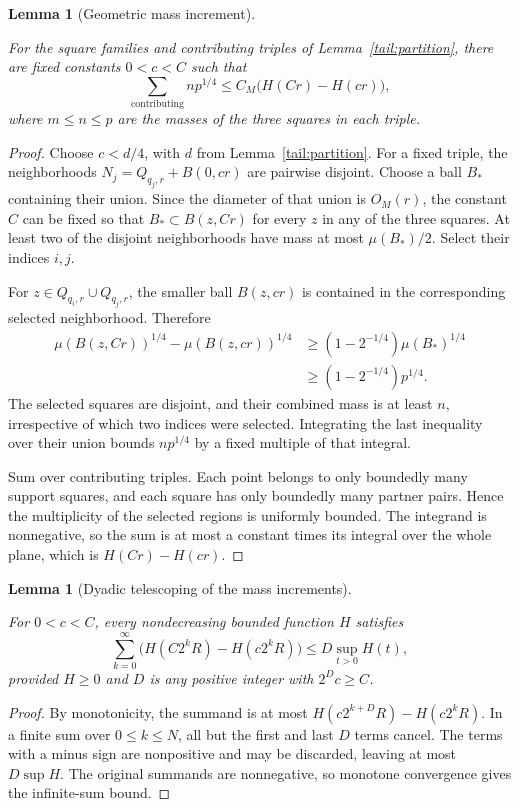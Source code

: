 \documentclass[11pt]{amsart}
\newtheorem{lemma}[theorem]{Lemma}
\theoremstyle{definition}
\theoremstyle{remark}
\numberwithin{equation}{section}
\providecommand{\lean}[1]{}
\providecommand{\leanok}{}
\begin{document}
\begin{lemma}[Geometric mass increment]\label{tail:increment}
\lean{Auto.tail_increment}
\leanok
For the square families and contributing triples of
Lemma~\ref{tail:partition}, there are fixed constants $0<c<C$ such that
\[
 \sum_{\mathrm{contributing}}n p^{1/4}
       \le C_M\big(H(Cr)-H(cr)\big),
\]
where $m\le n\le p$ are the masses of the three squares in each triple.
\end{lemma}
\begin{proof}
Choose $c<d/4$, with $d$ from Lemma~\ref{tail:partition}. For a fixed
triple, the neighborhoods $N_j=Q_{q_j,r}+B(0,cr)$ are pairwise disjoint.
Choose a ball $B_*$ containing their union. Since the diameter of that
union is $O_M(r)$, the constant $C$ can be fixed so that
$B_*\subset B(z,Cr)$ for every $z$ in any of the three squares.
At least two of the disjoint neighborhoods have mass at most
$\mu(B_*)/2$. Select their indices $i,j$.

For $z\in Q_{q_i,r}\cup Q_{q_j,r}$, the smaller ball $B(z,cr)$ is
contained in the corresponding selected neighborhood. Therefore
\begin{align*}
 \mu(B(z,Cr))^{1/4}-\mu(B(z,cr))^{1/4}
 &\ge (1-2^{-1/4})\mu(B_*)^{1/4}\\
 &\ge (1-2^{-1/4})p^{1/4}.
\end{align*}
The selected squares are disjoint, and their combined mass is at least
$n$, irrespective of which two indices were selected. Integrating the
last inequality over their union bounds $n p^{1/4}$ by a fixed multiple
of that integral.

Sum over contributing triples. Each point belongs to only boundedly
many support squares, and each square has only boundedly many partner
pairs. Hence the multiplicity of the selected regions is uniformly
bounded. The integrand is nonnegative, so the sum is at most a constant
times its integral over the whole plane, which is $H(Cr)-H(cr)$.
\end{proof}

\begin{lemma}[Dyadic telescoping of the mass increments]
\label{tail:telescoping}
\lean{Auto.tail_telescoping}
\leanok
For $0<c<C$, every nondecreasing bounded function $H$ satisfies
\[
 \sum_{k=0}^{\infty}
       \big(H(C2^kR)-H(c2^kR)\big)
       \le D\sup_{t>0}H(t),
\]
provided $H\ge0$ and $D$ is any positive integer with $2^Dc\ge C$.
\end{lemma}
\begin{proof}
By monotonicity, the summand is at most
$H(c2^{k+D}R)-H(c2^kR)$. In a finite sum over $0\le k\le N$,
all but the first and last $D$ terms cancel. The terms with a minus
sign are nonpositive and may be discarded, leaving at most
$D\sup H$. The original summands are nonnegative, so monotone
convergence gives the infinite-sum bound.
\end{proof}
\end{document}
